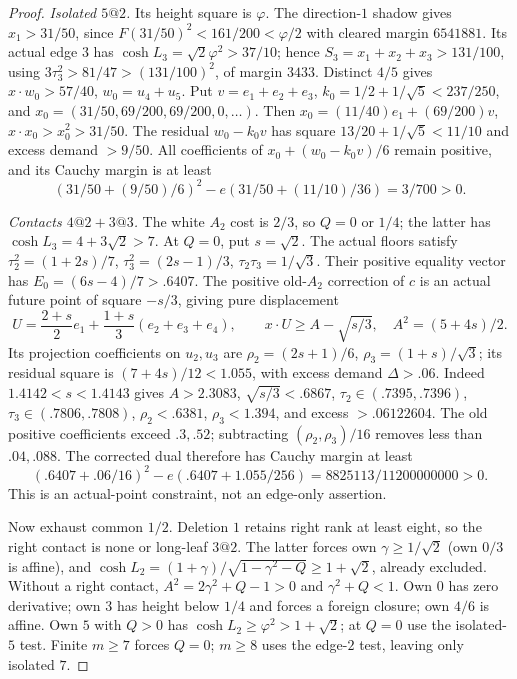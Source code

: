 \documentclass[11pt]{article}
\theoremstyle{definition}
\theoremstyle{remark}
\newcommand{\ph}{\varphi}
\begin{document}
\begin{proof}
\emph{Isolated $5@2$.}
Its height square is $\ph$. The direction-$1$ shadow gives
$x_1>31/50$, since $F(31/50)^2<161/200<\ph/2$ with cleared
margin $6541881$. Its actual edge $3$ has
$\cosh L_3=\sqrt2\ph^2>37/10$; hence
$S_3=x_1+x_2+x_3>131/100$, using
$3\tau_3^2>81/47>(131/100)^2$, of margin $3433$.
Distinct $4/5$ gives $x\cdot w_0>57/40$, $w_0=u_4+u_5$.
Put $v=e_1+e_2+e_3$, $k_0=1/2+1/\sqrt5<237/250$, and
$x_0=(31/50,69/200,69/200,0,\ldots)$.
Then $x_0=(11/40)e_1+(69/200)v$, $x\cdot x_0>x_0^2>31/50$.
The residual $w_0-k_0v$ has square $13/20+1/\sqrt5<11/10$
and excess demand $>9/50$.
All coefficients of $x_0+(w_0-k_0v)/6$ remain positive, and its
Cauchy margin is at least
\[
 (31/50+(9/50)/6)^2-e(31/50+(11/10)/36)=3/700>0.
\]

\emph{Contacts $4@2+3@3$.}
The white $A_2$ cost is $2/3$, so $Q=0$ or $1/4$; the latter has
$\cosh L_3=4+3\sqrt2>7$. At $Q=0$, put $s=\sqrt2$.
The actual floors satisfy
$\tau_2^2=(1+2s)/7$, $\tau_3^2=(2s-1)/3$,
$\tau_2\tau_3=1/\sqrt3$.
Their positive equality vector has $E_0=(6s-4)/7>.6407$.
The positive old-$A_2$ correction of $c$ is an actual future point
of square $-s/3$, giving pure displacement
\[
 U=\frac{2+s}{2}e_1+\frac{1+s}{3}(e_2+e_3+e_4),\qquad
 x\cdot U\ge A-\sqrt{s/3},\quad A^2=(5+4s)/2.
\]
Its projection coefficients on $u_2,u_3$ are
$\rho_2=(2s+1)/6$, $\rho_3=(1+s)/\sqrt3$;
its residual square is $(7+4s)/12<1.055$, with excess demand
$\Delta>.06$.
Indeed $1.4142<s<1.4143$ gives $A>2.3083$,
$\sqrt{s/3}<.6867$, $\tau_2\in(.7395,.7396)$,
$\tau_3\in(.7806,.7808)$, $\rho_2<.6381$, $\rho_3<1.394$,
and excess $>.06122604$.
The old positive coefficients exceed $.3,.52$; subtracting
$(\rho_2,\rho_3)/16$ removes less than $.04,.088$.
The corrected dual therefore has Cauchy margin at least
\[
 (.6407+.06/16)^2-e(.6407+1.055/256)
       =8825113/11200000000>0.
\]
This is an actual-point constraint, not an edge-only assertion.

Now exhaust common $1/2$. Deletion $1$ retains right rank at least
eight, so the right contact is none or long-leaf $3@2$.
The latter forces own $\gamma\ge1/\sqrt2$ (own $0/3$ is affine),
and $\cosh L_2=(1+\gamma)/\sqrt{1-\gamma^2-Q}\ge1+\sqrt2$,
already excluded. Without a right contact,
$A^2=2\gamma^2+Q-1>0$ and $\gamma^2+Q<1$.
Own $0$ has zero derivative; own $3$ has height below $1/4$ and
forces a foreign closure; own $4/6$ is affine.
Own $5$ with $Q>0$ has $\cosh L_2\ge\ph^2>1+\sqrt2$;
at $Q=0$ use the isolated-$5$ test. Finite $m\ge7$ forces $Q=0$;
$m\ge8$ uses the edge-$2$ test, leaving only isolated $7$.


\end{proof}
\end{document}
